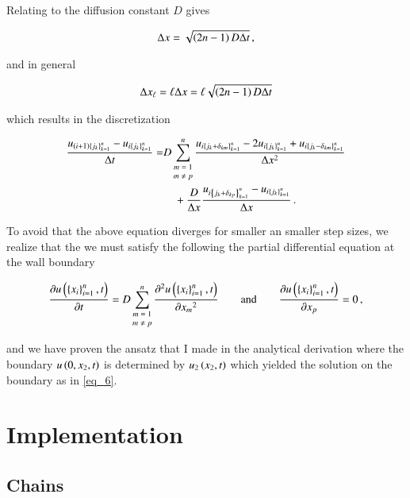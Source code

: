 \documentclass[11pt,english,a4paper]{article}
\begin{document}
\begin{flushleft}
Relating to the diffusion constant $D$ gives

\begin{align}
\Delta x = \sqrt{\left({2n-1}\right)D\Delta t} \,,
\label{eq_51}
\end{align}

and in general

\begin{align}
\Delta x_\ell = \ell \Delta x = \ell\sqrt{\left({2n-1}\right)D\Delta t}
\label{eq_52}
\end{align}

which results in the discretization

\begin{align*}
\frac{u_{(i+1)\left\lbrace{j_k}\right\rbrace_{k=1}^n}-u_{i\left\lbrace{j_k}\right\rbrace_{k=1}^n}}{\Delta t} =& D\sum_{\scriptsize\begin{matrix}m=1\\ m\neq p\end{matrix}}^n\frac{u_{i\left\lbrace{j_k+\delta_{km}}\right\rbrace_{k=1}^n} - 2 u_{i\left\lbrace{j_k}\right\rbrace_{k=1}^n} + u_{i\left\lbrace{j_k-\delta_{km}}\right\rbrace_{k=1}^n}}{\Delta x^2} 
\\&\quad + \frac{D}{\Delta x} \frac{u_{i\left\lbrace{j_k+\delta_{kp}}\right\rbrace_{k=1}^n} - u_{i\left\lbrace{j_k}\right\rbrace_{k=1}^n}}{\Delta x} \,.
\end{align*}

To avoid that the above equation diverges for smaller an smaller step sizes, we realize that the we must satisfy the following the partial differential equation at the wall boundary

\begin{align}
\frac{\partial u\left({\left\lbrace{x_i}\right\rbrace_{i=1}^n, t}\right)}{\partial t} = D\sum_{\scriptsize\begin{matrix}m=1\\ m\neq p\end{matrix}}^n \frac{\partial^2 u\left({\left\lbrace{x_i}\right\rbrace_{i=1}^n, t}\right)}{\partial {x_m}^2} \qquad \text{and} \qquad \frac{\partial u\left({\left\lbrace{x_i}\right\rbrace_{i=1}^n, t}\right)}{\partial x_p} = 0 \,,
\label{eq_53}
\end{align}

and we have proven the ansatz that I made in the analytical derivation where the boundary $u\left({0,x_2,t}\right)$ is determined by $u_2\left({x_2,t}\right)$ which yielded the solution on the boundary as in \eqref{eq_6}.

\section{Implementation}

\subsection{Chains}


\end{flushleft}
\end{document}
